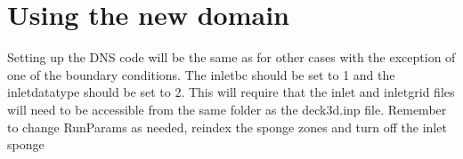 \documentclass[12pt, oneside]{article}
\begin{document}
\section{Using the new domain}

Setting up the DNS code will be the same as for other cases with the exception of one of the boundary conditions. The inletbc should be set to 1 and the inletdatatype should be set to 2. 
This will require that the inlet and inletgrid files will need to be accessible from the same folder as the deck3d.inp file. \newline
Remember to change RunParams as needed, reindex the sponge zones and turn off the inlet sponge
\end{document}
